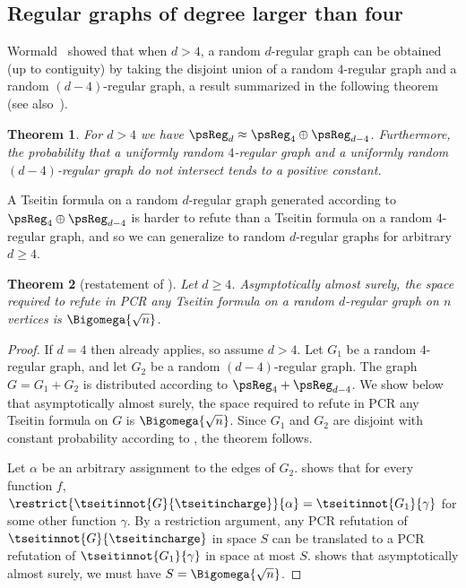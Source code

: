 \documentclass[11pt]{article}
\numberwithin{equation}{section}
\newtheorem{theorem}{Theorem}[section]
\theoremstyle{definition}
\theoremstyle{plain}
\begin{document}
%

\subsection{Regular graphs of degree larger than four}
Wormald~\cite[Corollary 4.17]{W} showed that when $d > 4$, a random $d$-regular graph can be obtained (up to contiguity) by taking the disjoint union of a random $4$-regular graph and a random $(d-4)$-regular graph, a result summarized in the following theorem (see also~\cite[Corollary 9.44]{JLR}).

\begin{theorem}\label{th:regular}
 For $d > 4$ we have $\psReg_d \approx \psReg_4 \oplus \psReg_{d-4}$. Furthermore, the probability that a uniformly random $4$-regular graph and a uniformly random $(d-4)$-regular graph do not intersect tends to a positive constant.
\end{theorem}

A Tseitin formula on a random $d$-regular graph generated according to $\psReg_4 \oplus \psReg_{d-4}$ is harder to refute than a Tseitin formula on a random $4$-regular graph, and so we can generalize  to random $d$-regular graphs for arbitrary $d \geq 4$.

\begin{theorem}[restatement of ]
 Let $d \geq 4$. Asymptotically almost surely, the space required to refute in PCR any Tseitin formula on a random $d$-regular graph on $n$ vertices is $\Bigomega{\sqrt{n}}$.
\end{theorem}
\begin{proof}
 If $d = 4$ then  already applies, so assume $d > 4$.
 Let $G_1$ be a random $4$-regular graph, and let $G_2$ be a random $(d-4)$-regular graph. The graph $G = G_1 + G_2$ is distributed according to $\psReg_4 + \psReg_{d-4}$. We show below that asymptotically almost surely, the space required to refute in PCR any Tseitin formula on $G$ is $\Bigomega{\sqrt{n}}$. Since $G_1$ and $G_2$ are disjoint with constant probability according to , the theorem follows.

 Let $\alpha$ be an arbitrary assignment to the edges of $G_2$.  shows that for every function $f$, $\restrict{\tseitinnot{G}{\tseitincharge}}{\alpha} = \tseitinnot{G_1}{\gamma}$ for some other function $\gamma$. By a restriction argument, any PCR refutation of $\tseitinnot{G}{\tseitincharge}$ in space $S$ can be translated to a PCR refutation of $\tseitinnot{G_1}{\gamma}$ in space at most $S$.  shows that asymptotically almost surely, we must have $S  = \Bigomega{\sqrt{n}}$.
\end{proof}
\end{document}
